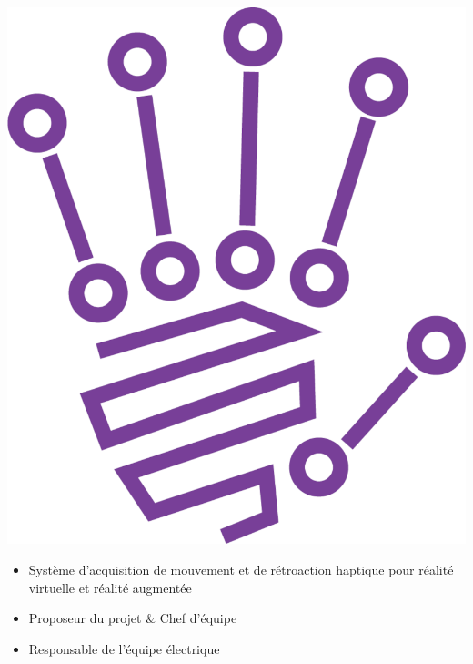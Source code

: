 \documentclass[10pt,a4paper,withhyper]{altacv}
\begin{document}
\hfill\begin{minipage}{1.25cm}
    \includegraphics[width=\linewidth]{figures/reali-plus}
\end{minipage}
\vspace{-1.1cm}

\begin{itemize}
\item Système d'acquisition de mouvement et de rétroaction haptique pour réalité virtuelle et réalité augmentée
\item Proposeur du projet \& Chef d'équipe
\item Responsable de l'équipe électrique
\end{itemize}

\medskip

\end{document}
